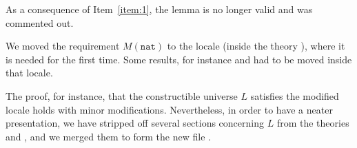 As a consequence of Item~\ref{item:1}, the lemma
 is no longer valid and was commented
out.

We moved the requirement $M(\mathtt{nat})$ to the locale
 (inside the theory ), where it is needed for the first time. Some results,
for instance  and 
 had to be moved inside that
locale.

The proof, for instance, that the constructible universe $L$ satisfies
the modified locale  holds with minor
modifications. Nevertheless, in order to have a neater presentation,
we have stripped off several sections concerning $L$ from the theories
 and , and we merged them to form
the new file  . 

